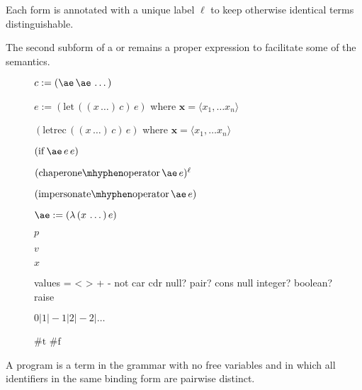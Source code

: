 \documentclass{sigplanconf}
\begin{document}
Each  form is annotated with a unique label $\ell$ to keep otherwise identical terms distinguishable.

The second subform of a  or  remains a proper expression to facilitate some of the semantics.

\newcommand{\vx}[0]{\mathbf{x}}

\newcommand{\appe}[2]{(#1\,#2)}
\newcommand{\lame}[2]{(\lambda\,(#1)\,#2)}
\newcommand{\chae}[2]{(\mathrm{chaperone\mhyphen operator}\,#1\,#2)^\ell}
\newcommand{\impe}[2]{(\mathrm{impersonate\mhyphen operator}\,#1\,#2)}
\newcommand{\lete}[3]{(\mathrm{let}\,((#1)\,#2)\,#3)}
\newcommand{\letrece}[3]{(\mathrm{letrec}\,((#1)\,#2)\,#3)}
\newcommand{\ife}[3]{(\mathrm{if}\,#1\,#2\,#3)}

\newcommand{\ande}[2]{(\mathrm{and}\,#1\,#2)}
\newcommand{\ore}[2]{(\mathrm{or}\,#1\,#2)}

\newcommand{\true}[0]{\mathrm{\#t}}
\newcommand{\false}[0]{\mathrm{\#f}}

\begin{figure}
\label{fig:syntax}
$c:=\appe{\ae}{\ae\,\dots}$

$e:=\lete{x\,\dots}{c}{e}$ where $\vx=\langle x_1,\dots x_n\rangle$

$\letrece{x\,\dots}{c}{e}$ where $\vx=\langle x_1,\dots x_n\rangle$

$\ife{\ae}{e}{e}$

$\chae{\ae}{e}$

$\impe{\ae}{e}$

$\ae:=\lame{x\,\dots}{e}$

$p$

$v$

$x$

values = < > + - not car cdr null? pair? cons null integer? boolean? raise

$0|1|-1|2|-2|\dots$

$\true$
$\false$
\end{figure}

A program is a term in the grammar with no free variables and in which all identifiers in the same binding form are pairwise distinct.
\end{document}

